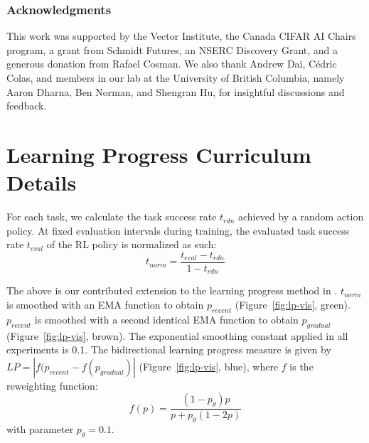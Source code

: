 \documentclass{article} %
\begin{document}

\subsubsection*{Acknowledgments}
This work was supported by the Vector Institute, the Canada CIFAR AI Chairs program, a grant from Schmidt Futures, an NSERC Discovery Grant, and a generous donation from Rafael Cosman. We also thank Andrew Dai, Cédric Colas, and members in our lab at the University of British Columbia, namely Aaron Dharna, Ben Norman, and Shengran Hu, for insightful discussions and feedback.




\clearpage
\appendix


\section{Learning Progress Curriculum Details}
\label{app:learning-progress}
For each task, we calculate the task success rate $t_{rdn}$ achieved by a random action policy. At fixed evaluation intervals during training, the evaluated task success rate $t_{eval}$ of the RL policy is normalized as such:
$$t_{norm} = \frac{t_{eval} - t_{rdn}}{1 - t_{rdn}}$$

The above is our contributed extension to the learning progress method in \citet{ingmar}. $t_{norm}$ is smoothed with an EMA function to obtain $p_{recent}$ (Figure~\ref{fig:lp-vis}, green). $p_{recent}$ is smoothed with a second identical EMA function to obtain $p_{gradual}$ (Figure~\ref{fig:lp-vis}, brown). The exponential smoothing constant applied in all experiments is 0.1. The bidirectional learning progress measure is given by $LP = |f(p_{recent} - f(p_{gradual})|$ (Figure~\ref{fig:lp-vis}, blue), where $f$ is the reweighting function: 
$$f(p) = \frac{(1 - p_\theta)p}{p + p_\theta(1 - 2p)}$$
with parameter $p_\theta = 0.1$.
\end{document}
